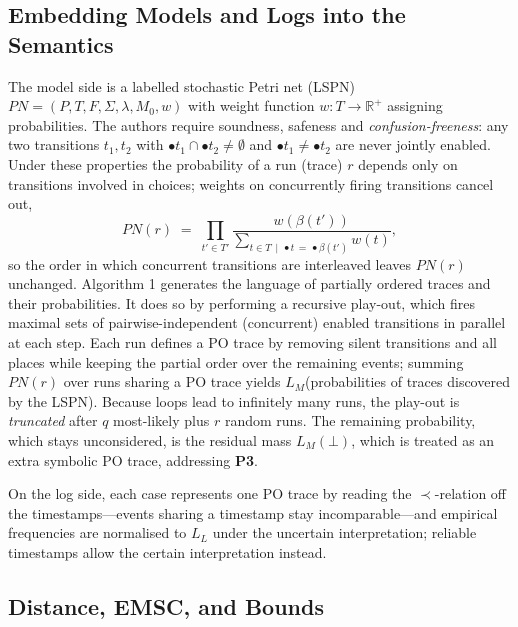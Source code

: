 \documentclass[runningheads]{llncs}
\begin{document}
\subsection{Embedding Models and Logs into the Semantics}

The model side is a labelled stochastic Petri net (LSPN) $PN = (P, T, F, \Sigma, \lambda, M_{0}, w)$ with weight function $w\colon T \to \mathbb{R}^{+}$ assigning probabilities. The authors require soundness, safeness and \emph{confusion-freeness}: any two transitions $t_{1}, t_{2}$ with $\bullet t_{1} \cap \bullet t_{2} \neq \emptyset$ and $\bullet t_{1} \neq \bullet t_{2}$ are never jointly enabled. Under these properties the probability of a run (trace) $r$ depends only on transitions involved in choices; weights on concurrently firing transitions cancel out,
\begin{equation}
PN(r) \;=\; \prod_{t' \in T'} \frac{w(\beta(t'))}{\sum_{t \in T \,\mid\, \bullet t \,=\, \bullet \beta(t')} w(t)},
\end{equation}
so the order in which concurrent transitions are interleaved leaves $PN(r)$ unchanged. Algorithm 1 \cite{poemsc}  generates the language of partially ordered traces and their probabilities. It does so by performing a recursive play-out, which fires maximal sets of pairwise-independent (concurrent) enabled transitions in parallel at each step. Each run defines a PO trace by removing silent transitions and all places while keeping the partial order over the remaining events; summing $PN(r)$ over runs sharing a PO trace yields $L_{M}$(probabilities of traces discovered by the LSPN). Because loops lead to infinitely many runs, the play-out is \emph{truncated} after $q$ most-likely plus $r$ random runs. The remaining probability, which stays unconsidered, is the residual mass $L_{M}(\bot)$, which is treated as an extra symbolic PO trace, addressing \textbf{P3}. 

On the log side, each case represents one PO trace by reading the $\prec$-relation off the timestamps---events sharing a timestamp stay incomparable---and empirical frequencies are normalised to $L_{L}$ under the uncertain interpretation; reliable timestamps allow the certain interpretation instead.

\subsection{Distance, EMSC, and Bounds}
\end{document}
